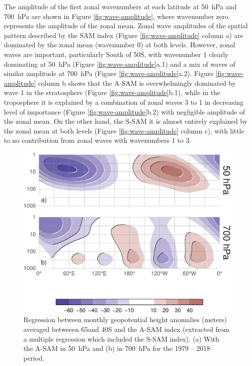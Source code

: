 \documentclass[smallextended]{svjour3}       %
\begin{document}
The amplitude of the first zonal wavenumbers at each latitude at 50~hPa and 700~hPa are shown in Figure \ref{fig:wave-amplitude}, where wavenumber zero represents the amplitude of the zonal mean.
Zonal wave amplitudes of the spatial pattern described by the SAM index (Figure \ref{fig:wave-amplitude} column a) are dominated by the zonal mean (wavenumber 0) at both levels.
However, zonal waves are important, particularly South of 50\degree S, with wavenumber 1 clearly dominating at 50~hPa (Figure \ref{fig:wave-amplitude}a.1) and a mix of waves of similar amplitude at 700~hPa (Figure \ref{fig:wave-amplitude}a.2).
Figure \ref{fig:wave-amplitude} column b shows that the A\nobreakdash-SAM is overwhelmingly dominated by wave 1 in the stratosphere (Figure \ref{fig:wave-amplitude}b.1), while in the troposphere it is explained by a combination of zonal waves 3 to 1 in decreasing level of importance (Figure \ref{fig:wave-amplitude}b.2) with negligible amplitude of the zonal mean.
On the other hand, the S\nobreakdash-SAM it is almost entirely explained by the zonal mean at both levels (Figure \ref{fig:wave-amplitude} column c), with little to no contribution from zonal waves with wavenumbers 1 to 3.

\begin{figure}
\includegraphics{vertical-regression-1} \caption{Regression between monthly geopotential height anomalies (meters) averaged betweeen 65\degree and 40\degree S and the A\nobreakdash-SAM index (extracted from a multiple regression which included the S\nobreakdash-SAM index). (a) With the A\nobreakdash-SAM in 50~hPa and (b) in 700~hPa for the 1979 -- 2018 period.}\label{fig:vertical-regression}
\end{figure}
\end{document}

